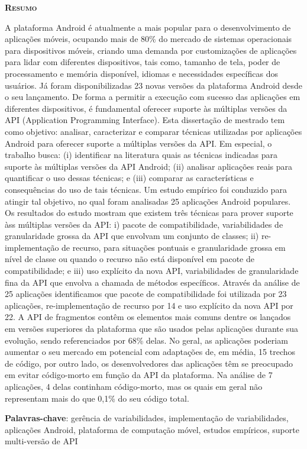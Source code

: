 
\begin{center}
	\Large{\textsc{\textbf{Resumo}}}
\end{center}

\noindent A plataforma Android é atualmente a mais popular para o desenvolvimento
de aplicações móveis, ocupando mais de 80\% do mercado de sistemas operacionais para
dispositivos móveis, criando uma demanda por customizações de aplicações para lidar
com diferentes dispositivos, tais como, tamanho de tela, poder de processamento e
memória disponível, idiomas e necessidades específicas dos usuários. Já foram
disponibilizadas 23 novas versões da plataforma Android desde o seu lançamento. De
forma a permitir a execução com sucesso das aplicações em diferentes dispositivos,
é fundamental oferecer suporte às múltiplas versões da API (Application Programming
Interface). Esta dissertação de mestrado tem como objetivo: analisar,
caracterizar e comparar técnicas utilizadas por aplicações Android para oferecer
suporte a múltiplas versões da API. Em especial, o trabalho busca: (i) identificar
na literatura quais as técnicas indicadas para suporte às múltiplas versões da API
Android; (ii) analisar aplicações reais para quantificar o uso dessas técnicas; e
(iii) comparar as características e consequências do uso de tais
técnicas. Um estudo empírico foi conduzido para atingir tal objetivo, no qual
foram analisadas 25 aplicações Android populares. Os resultados do estudo mostram
que existem três técnicas para prover suporte àss múltiplas versões da API: i) pacote
de compatibilidade, variabilidades de granularidade grossa da API que envolvam um
conjunto de classes; ii) re-implementação de recurso, para situações pontuais e
granularidade grossa em nível de classe ou quando o recurso não está disponível
em pacote de compatibilidade; e iii) uso explícito da nova API, variabilidades de
granularidade fina da API que envolva a chamada de métodos específicos. Através da
análise de 25 aplicações identificamos que pacote de compatibilidade foi utilizada
por 23 aplicações, re-implementação de recurso por 14 e uso explícito da nova API
por 22. A API de fragmentos contêm os elementos mais comuns dentre os lançados em
versões superiores da plataforma que são usados pelas aplicações durante sua evolução,
sendo referenciados por 68\% delas. No geral, as aplicações poderiam aumentar o seu
mercado em potencial com adaptações de, em média, 15 trechos de código, por outro
lado, os desenvolvedores das aplicações têm se preocupado em evitar código-morto em
função da API da plataforma. Na análise de 7 aplicações, 4 delas continham código-morto,
mas os quais em geral não representam mais do que 0,1\% do seu código total.

\noindent\textbf{Palavras-chave}: gerência de variabilidades, implementação de
variabilidades, aplicações Android, plataforma de computação móvel, estudos empíricos,
suporte multi-versão de API